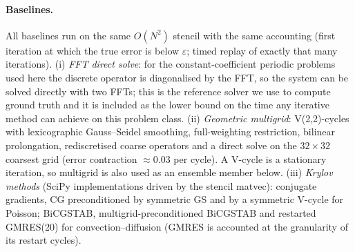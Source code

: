 \paragraph{Baselines.} All baselines run on the same $O(N^2)$ stencil with the same accounting (first iteration at which the true error is below $\varepsilon$; timed replay of exactly that many iterations). (i) \emph{FFT direct solve}: for the constant-coefficient periodic problems used here the discrete operator is diagonalised by the FFT, so the system can be solved directly with two FFTs; this is the reference solver we use to compute ground truth and it is included as the lower bound on the time any iterative method can achieve on this problem class. (ii) \emph{Geometric multigrid}: V(2,2)-cycles with lexicographic Gauss--Seidel smoothing, full-weighting restriction, bilinear prolongation, rediscretised coarse operators and a direct solve on the $32\times 32$ coarsest grid (error contraction $\approx 0.03$ per cycle). A V-cycle is a stationary iteration, so multigrid is also used as an ensemble member below. (iii) \emph{Krylov methods} (SciPy implementations driven by the stencil matvec): conjugate gradients, CG preconditioned by symmetric GS and by a symmetric V-cycle for Poisson; BiCGSTAB, multigrid-preconditioned BiCGSTAB and restarted GMRES(20) for convection--diffusion (GMRES is accounted at the granularity of its restart cycles).

\begin{table}[H]
\color{red}
\centering
\caption{Strong classical baselines on the $128\times 128$ grid: median time to relative error $\varepsilon$ over $64$ instances (paired median speedup of the learned router with its best stationary pairing over each method in parentheses; $>1$ means the router is faster) and median iterations to $h^2$. The FFT solve is a direct method for this problem class and bounds every iterative solver from below.}
\resizebox{\textwidth}{!}{\cabaselines}
\label{tab:ca_baselines}
\end{table}

